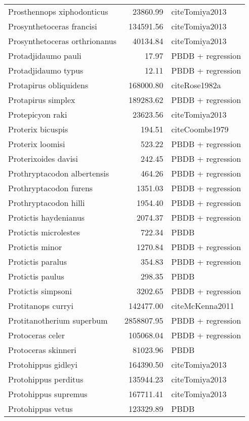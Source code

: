 \begin{table}[ht]
\begin{tabular}{lrl}
  Prosthennops xiphodonticus & 23860.99 & cite{Tomiya2013} \\ 
  Prosynthetoceras francisi & 134591.56 & cite{Tomiya2013} \\ 
  Prosynthetoceras orthrionanus & 40134.84 & cite{Tomiya2013} \\ 
  Protadjidaumo pauli & 17.97 & PBDB + regression \\ 
  Protadjidaumo typus & 12.11 & PBDB + regression \\ 
  Protapirus obliquidens & 168000.80 & cite{Rose1982a} \\ 
  Protapirus simplex & 189283.62 & PBDB + regression \\ 
  Protepicyon raki & 23623.56 & cite{Tomiya2013} \\ 
  Proterix bicuspis & 194.51 & cite{Coombs1979} \\ 
  Proterix loomisi & 523.22 & PBDB + regression \\ 
  Proterixoides davisi & 242.45 & PBDB + regression \\ 
  Prothryptacodon albertensis & 464.26 & PBDB + regression \\ 
  Prothryptacodon furens & 1351.03 & PBDB + regression \\ 
  Prothryptacodon hilli & 1954.40 & PBDB + regression \\ 
  Protictis haydenianus & 2074.37 & PBDB + regression \\ 
  Protictis microlestes & 722.34 & PBDB \\ 
  Protictis minor & 1270.84 & PBDB + regression \\ 
  Protictis paralus & 354.83 & PBDB + regression \\ 
  Protictis paulus & 298.35 & PBDB \\ 
  Protictis simpsoni & 3202.65 & PBDB + regression \\ 
  Protitanops curryi & 142477.00 & cite{McKenna2011} \\ 
  Protitanotherium superbum & 2858807.95 & PBDB + regression \\ 
  Protoceras celer & 105068.04 & PBDB + regression \\ 
  Protoceras skinneri & 81023.96 & PBDB \\ 
  Protohippus gidleyi & 164390.50 & cite{Tomiya2013} \\ 
  Protohippus perditus & 135944.23 & cite{Tomiya2013} \\ 
  Protohippus supremus & 167711.41 & cite{Tomiya2013} \\ 
  Protohippus vetus & 123329.89 & PBDB \\ 

\end{tabular}
\end{table}
